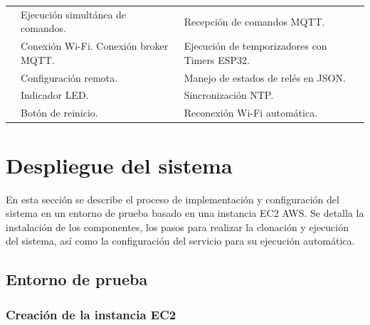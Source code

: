 \begin{table}[H]
\begin{tabular}{p{1.5cm}p{5.4cm}p{5.5cm}}
                                                          & Ejecución simultánea de comandos.                                              & Recepción de comandos MQTT.                     \\
                                                          & Conexión Wi-Fi.                     Conexión broker MQTT.                      & Ejecución de temporizadores con Timers ESP32.   \\
                                                          & Configuración remota.                                                          & Manejo de estados de relés en JSON.             \\
                                                          & Indicador LED.                                                                 & Sincronización NTP.                             \\
                                                          & Botón de reinicio.                                                             & Reconexión Wi-Fi automática.                    \\
        \bottomrule
        \hline
    \end{tabular}
    \label{tab:nodos_iot}
\end{table}

\section{Despliegue del sistema}

En esta sección se describe el proceso de implementación y configuración del
sistema en un entorno de prueba basado en una instancia EC2 AWS. Se detalla la
instalación de los componentes, los pasos para realizar la clonación y
ejecución del sistema, así como la configuración del servicio para su ejecución
automática.

\subsection{Entorno de prueba}

\subsubsection{Creación de la instancia EC2}

